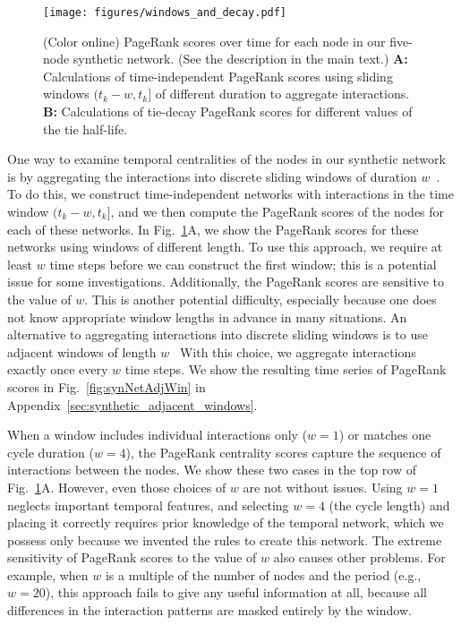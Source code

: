 \documentclass[journal,transmag]{IEEEtran}
\begin{document}
\begin{figure}[tp]
  \centering
  \texttt{[image: figures/windows\_and\_decay.pdf]}
  \caption{(Color online) 
  PageRank scores over time for each node in our five-node synthetic
    network. (See the description in the main text.)
     {\bf A:} Calculations of time-independent PageRank scores using sliding windows $(t_k - w, t_k]$ of
  different duration to aggregate interactions.  {\bf B:} Calculations
  of tie-decay PageRank scores for different values of the tie half-life.
  }
  \label{fig:synNetCent}
\end{figure}


One way to examine temporal centralities of the nodes in our synthetic
network is by aggregating the interactions into discrete sliding
windows of duration $w$~\cite{peel2015detecting, ridder2016detection}.
To do this, we construct time-independent networks with interactions in the time window $(t_k - w, t_k]$,
 and we then compute the PageRank
scores of the nodes for each of these networks. In
Fig.~\ref{fig:synNetCent}A, we show the PageRank scores for these
networks using windows of different length. To use this approach, we
require at least $w$ time steps before we can construct the first
window; this is a potential issue for some
investigations. Additionally, the PageRank scores are sensitive to the
value of $w$. This is another potential difficulty, especially because
one does not know appropriate window lengths in
advance in many situations.  An alternative to aggregating
interactions into discrete sliding windows is to use adjacent windows
of length $w$~\cite{braha2009time}
With this choice, we
aggregate interactions exactly once every $w$ time steps. We show the
resulting time series of PageRank scores in Fig.~\ref{fig:synNetAdjWin} in
Appendix~\ref{sec:synthetic_adjacent_windows}.

When a window includes individual interactions only ($w=1$) or
matches one cycle duration ($w=4$), the PageRank centrality scores capture the
sequence of interactions between the nodes. We show these two cases in
the top row of Fig.~\ref{fig:synNetCent}A. However, even those choices of $w$
are not without issues. Using $w=1$ neglects important temporal
features, and selecting $w=4$ (the cycle length) and placing it
correctly requires prior knowledge of the temporal network, which we
possess only because we invented the rules to create this network.
The extreme sensitivity of PageRank scores to the value of $w$ also causes other problems.
For example, when $w$ is a multiple of the
number of nodes and the period (e.g., $w=20$), this approach fails to
give any useful information at all, because all differences in the
interaction patterns are masked entirely by the window.
\end{document}
